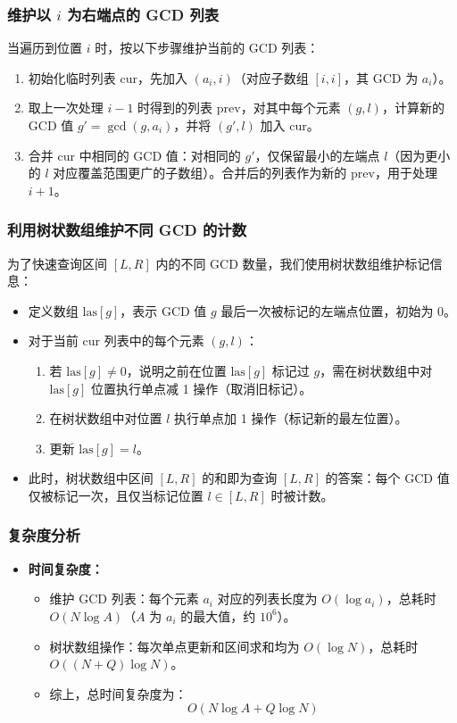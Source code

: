 \documentclass[11pt,a4paper,twocolumn]{ctexart}  %
\begin{document}
\subsubsection*{维护以 $i$ 为右端点的 GCD 列表}
当遍历到位置 $i$ 时，按以下步骤维护当前的 GCD 列表：
\begin{enumerate}
    \item 初始化临时列表 $\mathrm{cur}$，先加入 $(a_i, i)$（对应子数组 $[i, i]$，其 GCD 为 $a_i$）。
    \item 取上一次处理 $i-1$ 时得到的列表 $\mathrm{prev}$，对其中每个元素 $(g, l)$，计算新的 GCD 值 $g' = \gcd(g, a_i)$，并将 $(g', l)$ 加入 $\mathrm{cur}$。
    \item 合并 $\mathrm{cur}$ 中相同的 GCD 值：对相同的 $g'$，仅保留最小的左端点 $l$（因为更小的 $l$ 对应覆盖范围更广的子数组）。合并后的列表作为新的 $\mathrm{prev}$，用于处理 $i+1$。
\end{enumerate}

\subsubsection*{利用树状数组维护不同 GCD 的计数}
为了快速查询区间 $[L, R]$ 内的不同 GCD 数量，我们使用树状数组维护标记信息：
\begin{itemize}
    \item 定义数组 $\mathrm{las}[g]$，表示 GCD 值 $g$ 最后一次被标记的左端点位置，初始为 0。
    \item 对于当前 $\mathrm{cur}$ 列表中的每个元素 $(g, l)$：
    \begin{enumerate}
        \item 若 $\mathrm{las}[g] \neq 0$，说明之前在位置 $\mathrm{las}[g]$ 标记过 $g$，需在树状数组中对 $\mathrm{las}[g]$ 位置执行单点减 1 操作（取消旧标记）。
        \item 在树状数组中对位置 $l$ 执行单点加 1 操作（标记新的最左位置）。
        \item 更新 $\mathrm{las}[g] = l$。
    \end{enumerate}
    \item 此时，树状数组中区间 $[L, R]$ 的和即为查询 $[L, R]$ 的答案：每个 GCD 值仅被标记一次，且仅当标记位置 $l \in [L, R]$ 时被计数。
\end{itemize}

\subsubsection*{复杂度分析}
\begin{itemize}
    \item \textbf{时间复杂度：}
    \begin{itemize}
        \item 维护 GCD 列表：每个元素 $a_i$ 对应的列表长度为 $O(\log a_i)$，总耗时 $O(N \log A)$（$A$ 为 $a_i$ 的最大值，约 $10^6$）。
        \item 树状数组操作：每次单点更新和区间求和均为 $O(\log N)$，总耗时 $O((N + Q) \log N)$。
        \item 综上，总时间复杂度为：
        \[
            O(N \log A + Q \log N)
        \]
    \end{itemize}
\end{itemize}
\end{document}
